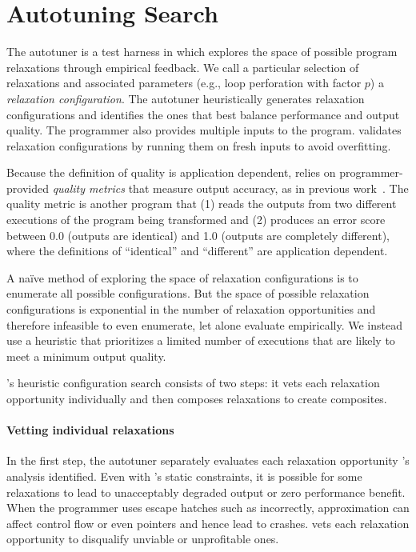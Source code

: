 \section{Autotuning Search}
\label{accept:sec:autotuner}

The autotuner is a test harness in which \sysname explores the space of possible
program relaxations through empirical feedback.  We call
a particular selection of relaxations and associated parameters (e.g., loop
perforation with factor $p$) a \emph{relaxation configuration}.  The
autotuner heuristically generates relaxation configurations and identifies the
ones that best balance performance and output quality.
%
The programmer also provides multiple inputs to the program.  \sysname validates
relaxation configurations by running them on fresh inputs to avoid overfitting.

Because the definition of quality is application dependent, \sysname relies on
programmer-provided \emph{quality metrics} that measure output
accuracy, as in previous work~\cite{enerj, truffle, qosprof, carbin-pldi, green,
npu}.
The quality metric is another program that (1) reads the outputs
from two different executions of the program being transformed and (2) produces
an error score between 0.0 (outputs are identical) and 1.0 (outputs are
completely different), where the definitions of ``identical'' and ``different''
are application dependent.

A na\"ive method of exploring the space of relaxation configurations is to
enumerate all possible configurations.
But the space of possible relaxation configurations is exponential in the number
of relaxation opportunities and therefore infeasible to even enumerate, let
alone evaluate empirically.
We instead use a heuristic that prioritizes a limited number of
executions that are likely to meet a minimum output quality.

\sysname's heuristic configuration search consists of two steps: it vets each
relaxation opportunity individually and then composes relaxations to create
composites.

\paragraph{Vetting individual relaxations}
In the first step, the autotuner separately evaluates each
relaxation opportunity \sysname's analysis identified. Even with \sysname's
static constraints, it is
possible for some relaxations to lead to unacceptably degraded output or
zero performance benefit.
When the programmer uses escape hatches such as 
incorrectly, approximation can affect control flow or even pointers and
hence lead to crashes.
\sysname vets each
relaxation opportunity to disqualify unviable or unprofitable ones.

